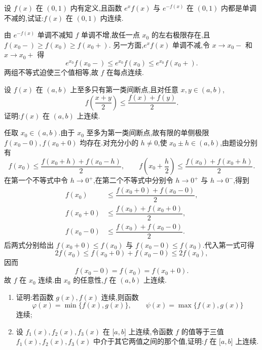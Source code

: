 \begin{example}
    设 $f(x)$ 在 $(0,1)$ 内有定义,且函数 $e^x f(x)$ 与 $e^{-f(x)}$ 在 $(0,1)$ 内都是单调不减的,试证:$f(x)$ 在 $(0,1)$ 内连续.
\end{example}
\exampleblank

\begin{solution}
    由 $e^{-f(x)}$ 单调不减知 $f$ 单调不增,故任一点 $x_0$ 的左右极限存在,且 $f(x_0-)\geq f(x_0)\geq f(x_0+)$.
    另一方面,$e^xf(x)$ 单调不减,令 $x\to x_0-$ 和 $x\to x_0+$ 得
    \[
        e^{x_0}f(x_0-)\leq e^{x_0}f(x_0)\leq e^{x_0}f(x_0+).
    \]
    两组不等式迫使三个值相等,故 $f$ 在每点连续.
\end{solution}

\begin{example}
    设 $f(x)$ 在 $(a,b)$ 上至多只有第一类间断点,且对任意 $x,y\in(a,b)$,
    \[
        f\left(\dfrac{x+y}{2}\right)\leq\dfrac{f(x)+f(y)}{2}.
    \]
    证明:$f(x)$ 在 $(a,b)$ 上连续.
\end{example}
\exampleblank

\begin{solution}
    任取 $x_0\in(a,b)$.由于 $x_0$ 至多为第一类间断点,故有限的单侧极限 $f(x_0-0),f(x_0+0)$ 均存在.对充分小的 $h\neq0$,使 $x_0\pm h\in(a,b)$,由题设分别有
    \[
        f(x_0)\leq\dfrac{f(x_0+h)+f(x_0-h)}{2},
        \qquad
        f\left(x_0+\dfrac{h}{2}\right)\leq\dfrac{f(x_0)+f(x_0+h)}{2}.
    \]
    在第一个不等式中令 $h\to0^+$,在第二个不等式中分别令 $h\to0^+$ 与 $h\to0^-$,得到
    \[
        \begin{aligned}
            f(x_0)&\leq\dfrac{f(x_0+0)+f(x_0-0)}{2},\\
            f(x_0+0)&\leq\dfrac{f(x_0)+f(x_0+0)}{2},\\
            f(x_0-0)&\leq\dfrac{f(x_0)+f(x_0-0)}{2}.
        \end{aligned}
    \]
    后两式分别给出 $f(x_0+0)\leq f(x_0)$ 与 $f(x_0-0)\leq f(x_0)$.代入第一式可得
    \[
        2f(x_0)\leq f(x_0+0)+f(x_0-0)\leq2f(x_0),
    \]
    因而
    \[
        f(x_0-0)=f(x_0)=f(x_0+0).
    \]
    故 $f$ 在 $x_0$ 连续.由 $x_0$ 的任意性,$f$ 在 $(a,b)$ 上连续.
\end{solution}

\begin{example}[\markstar]
    \begin{enumerate}
        \item 证明:若函数 $g(x),f(x)$ 连续,则函数
              \[
                  \varphi(x)=\min\{f(x),g(x)\}, \qquad \psi(x)=\max\{f(x),g(x)\}
              \]
              连续;
        \item 设 $f_1(x),f_2(x),f_3(x)$ 在 $\lbrack a,b\rbrack$ 上连续,令函数 $f$ 的值等于三值 $f_1(x),f_2(x),f_3(x)$ 中介于其它两值之间的那个值,证明:$f$ 在 $\lbrack a,b\rbrack$ 上连续.
    \end{enumerate}
\end{example}
\exampleblank


